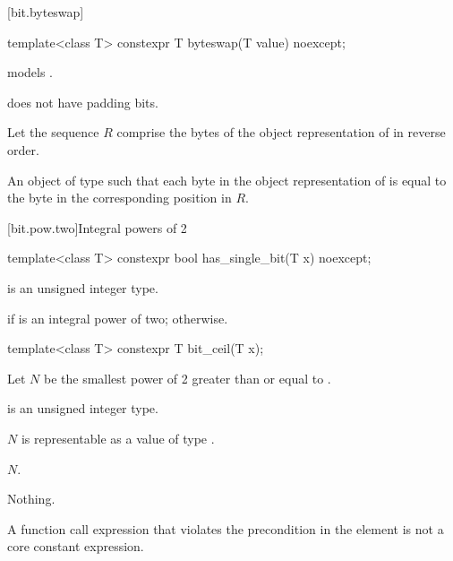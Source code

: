 [bit.byteswap]{}

%
\begin{itemdecl}
template<class T>
  constexpr T byteswap(T value) noexcept;
\end{itemdecl}

\begin{itemdescr}
\pnum
\constraints
{} models .

\pnum
\mandates
{} does not have padding bits.

\pnum
Let the sequence $R$ comprise
the bytes of the object representation of  in reverse order.

\pnum
\returns
An object  of type 
such that each byte in the object representation of  is equal to
the byte in the corresponding position in $R$.
\end{itemdescr}

[bit.pow.two]{Integral powers of 2}

%
\begin{itemdecl}
template<class T>
  constexpr bool has_single_bit(T x) noexcept;
\end{itemdecl}

\begin{itemdescr}
\pnum
\constraints
{} is an unsigned integer type.

\pnum
\returns
{} if  is an integral power of two;
 otherwise.

\end{itemdescr}

%
\begin{itemdecl}
template<class T>
  constexpr T bit_ceil(T x);
\end{itemdecl}

\begin{itemdescr}
\pnum
Let $N$ be the smallest power of 2 greater than or equal to .

\pnum
\constraints
{} is an unsigned integer type.

\pnum
\expects
$N$ is representable as a value of type .

\pnum
\returns
$N$.

\pnum
\throws
Nothing.

\pnum
\remarks
A function call expression
that violates the precondition in the \expects element
is not a core constant expression.
\end{itemdescr}

